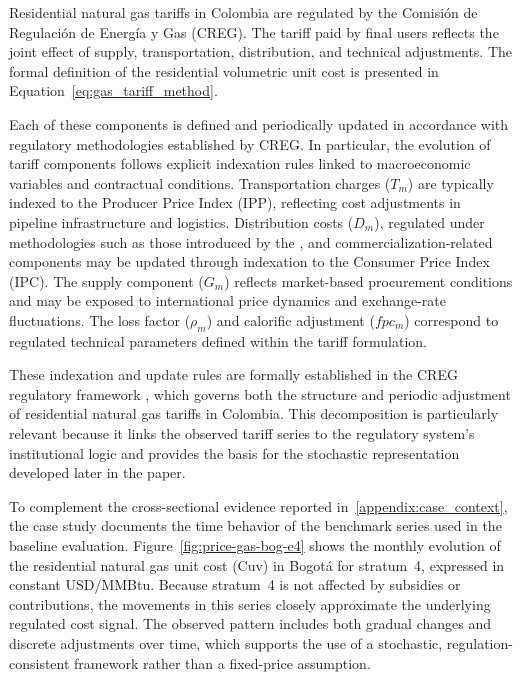 \documentclass[authoryear,preprint,review,10pt]{elsarticle}
\begin{document}
Residential natural gas tariffs in Colombia are regulated by the Comisión de Regulación de Energía y Gas (CREG). The tariff paid by final users reflects the joint effect of supply, transportation, distribution, and technical adjustments. The formal definition of the residential volumetric unit cost is presented in Equation~\ref{eq:gas_tariff_method}.

Each of these components is defined and periodically updated in accordance with regulatory methodologies established by CREG. In particular, the evolution of tariff components follows explicit indexation rules linked to macroeconomic variables and contractual conditions. Transportation charges ($T_m$) are typically indexed to the Producer Price Index (IPP), reflecting cost adjustments in pipeline infrastructure and logistics. Distribution costs ($D_m$), regulated under methodologies such as those introduced by the \citet{CREG008_2014}, and commercialization-related components may be updated through indexation to the Consumer Price Index (IPC). The supply component ($G_m$) reflects market-based procurement conditions and may be exposed to international price dynamics and exchange-rate fluctuations. The loss factor ($\rho_m$) and calorific adjustment ($fpc_m$) correspond to regulated technical parameters defined within the tariff formulation.

These indexation and update rules are formally established in the CREG regulatory framework \citep{CREG137_2013,CREG183_2013,CREG184_2014}, which governs both the structure and periodic adjustment of residential natural gas tariffs in Colombia. This decomposition is particularly relevant because it links the observed tariff series to the regulatory system's institutional logic and provides the basis for the stochastic representation developed later in the paper.

To complement the cross-sectional evidence reported in~\ref{appendix:case_context}, the case study documents the time behavior of the benchmark series used in the baseline evaluation. Figure~\ref{fig:price-gas-bog-e4} shows the monthly evolution of the residential natural gas unit cost (Cuv) in Bogotá for stratum~4, expressed in constant USD/MMBtu. Because stratum~4 is not affected by subsidies or contributions, the movements in this series closely approximate the underlying regulated cost signal. The observed pattern includes both gradual changes and discrete adjustments over time, which supports the use of a stochastic, regulation-consistent framework rather than a fixed-price assumption.
\end{document}
